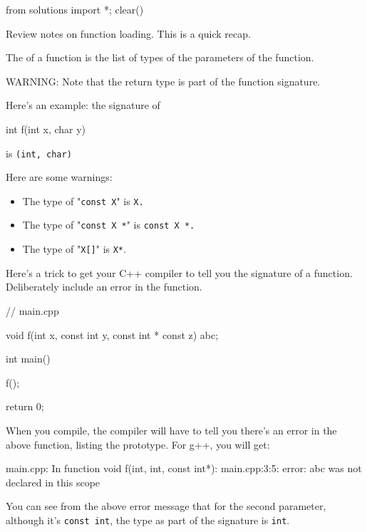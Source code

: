 \begin{python0}
from solutions import *; clear()
\end{python0}

Review notes on function loading. This is a quick recap.

The  of a function is the list of types of the
parameters of the function.

WARNING: Note that the return type is  part of the
function signature.

Here's an example: the signature of

\begin{consolethree}[escapeinside=||]
int f(int x, char y) {}
\end{consolethree}

is \texttt{(int, char)}

Here are some warnings:

\begin{itemize}
\item The type of "\texttt{const X}" is \texttt{X.}
\item The type of "\texttt{const X *}" is \texttt{const X *.}
\item The type of "\texttt{X[]}" is \texttt{X*}.
\end{itemize}

Here's a trick to get your C++ compiler to tell you the signature of a
function. Deliberately include an error in the function.

\begin{consolethree}[escapeinside=||]
// main.cpp

void f(int x, const int y, const int * const z)
{
    abc;
}

int main()
{
    f();

    return 0;
}
\end{consolethree}

When you compile, the compiler will have to tell you there's an error in
the above function, listing the prototype. For g++, you will get:

\begin{consolethree}[escapeinside=||]
main.cpp: In function void f(int, int, const int*):
main.cpp:3:5: error: abc was not declared in this
scope
\end{consolethree}

You can see from the above error message that for the second parameter,
although it's \texttt{const int}, the type as part of the
signature is \texttt{int}.



